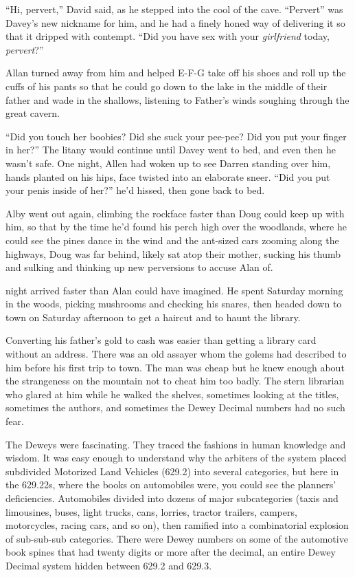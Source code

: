 ``Hi, pervert,'' David said, as he stepped into the cool of the cave. 
``Pervert'' was Davey's new nickname for him, and he had a finely
honed way of delivering it so that it dripped with contempt.  ``Did
you have sex with your \textit{girlfriend} today, \textit{pervert}?''

Allan turned away from him and helped E-F-G take off his shoes and
roll up the cuffs of his pants so that he could go down to the lake in
the middle of their father and wade in the shallows, listening to
Father's winds soughing through the great cavern.

``Did you touch her boobies?  Did she suck your pee-pee?  Did you put
your finger in her?'' The litany would continue until Davey went to
bed, and even then he wasn't safe.  One night, Allen had woken up to
see Darren standing over him, hands planted on his hips, face twisted
into an elaborate sneer.  ``Did you put your penis inside of her?''
he'd hissed, then gone back to bed.

Alby went out again, climbing the rockface faster than Doug could keep
up with him, so that by the time he'd found his perch high over the
woodlands, where he could see the pines dance in the wind and the
ant-sized cars zooming along the highways, Doug was far behind, likely
sat atop their mother, sucking his thumb and sulking and thinking up
new perversions to accuse Alan of.

 night arrived faster than Alan could have imagined.  He spent
Saturday morning in the woods, picking mushrooms and checking his
snares, then headed down to town on Saturday afternoon to get a
haircut and to haunt the library.

Converting his father's gold to cash was easier than getting a library
card without an address.  There was an old assayer whom the golems had
described to him before his first trip to town.  The man was cheap but
he knew enough about the strangeness on the mountain not to cheat him
too badly.  The stern librarian who glared at him while he walked the
shelves, sometimes looking at the titles, sometimes the authors, and
sometimes the Dewey Decimal numbers had no such fear.

The Deweys were fascinating.  They traced the fashions in human
knowledge and wisdom.  It was easy enough to understand why the
arbiters of the system placed subdivided Motorized Land Vehicles
(629.2) into several categories, but here in the 629.22s, where the
books on automobiles were, you could see the planners' deficiencies. 
Automobiles divided into dozens of major subcategories (taxis and
limousines, buses, light trucks, cans, lorries, tractor trailers,
campers, motorcycles, racing cars, and so on), then ramified into a
combinatorial explosion of sub-sub-sub categories.  There were Dewey
numbers on some of the automotive book spines that had twenty digits
or more after the decimal, an entire Dewey Decimal system hidden
between 629.2 and 629.3.

